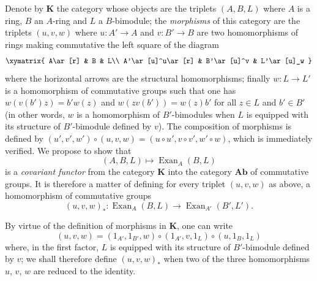 \begin{env}[18.3.5]
\label{0.18.3.5}
Denote by $\boldsymbol{K}$ the category whose objects are the triplets $(A,B,L)$ where $A$ is a ring, $B$ an $A$-ring and $L$ a $B$-bimodule; the \emph{morphisms} of this category are the triplets $(u,v,w)$ where $u:A'\to A$ and $v:B'\to B$ are two homomorphisms of rings making commutative the left square of the diagram
\[
  \xymatrix{
    A\ar[r] & B & L\\
    A'\ar[u]^u\ar[r] & B'\ar[u]^v & L'\ar[u]_w
  }
\]
where the horizontal arrows are the structural homomorphisms; finally $w:L\to L'$ is a homomorphism of commutative groups such that one has $w(v(b')z)=b'w(z)$ and $w(zv(b'))=w(z)b'$ for all $z\in L$ and $b'\in B'$ (in other words, $w$ is a homomorphism of $B'$-bimodules when $L$ is equipped with its structure of $B'$-bimodule defined by $v$).
The composition of morphisms is defined by $(u',v',w')\circ(u,v,w)=(u\circ u',v\circ v',w'\circ w)$, which is immediately verified.
We propose to show that
\begin{equation}
\tag{18.3.5.1}
  \label{0.18.3.5.1}
  (A,B,L)\mapsto\operatorname{Exan}_A(B,L)
\end{equation}
is a \emph{covariant functor} from the category $\boldsymbol{K}$ into the category $\boldsymbol{Ab}$ of commutative groups.
It is therefore a matter of defining for every triplet $(u,v,w)$ as above, a homomorphism of commutative groups
\[
  (u,v,w)_*:\operatorname{Exan}_A(B,L)\to\operatorname{Exan}_{A'}(B',L').
\]

By virtue of the definition of morphisms in $\boldsymbol{K}$, one can write
\[
  (u,v,w)=(1_{A'},1_{B'},w)\circ(1_{A'},v,1_L)\circ(u,1_B,1_L)
\]
where, in the first factor, $L$ is equipped with its structure of $B'$-bimodule defined by $v$; we shall therefore define $(u,v,w)_*$ when two of the three homomorphisms $u$, $v$, $w$ are reduced to the identity.
\end{env}

